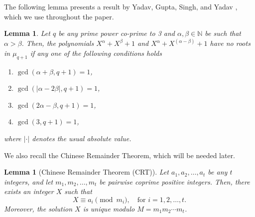 \documentclass[12pt,reqno]{amsart}
\newtheorem{lem}[thm]{Lemma}
\numberwithin{equation}{section}
\theoremstyle{definition}
\begin{document}
The following lemma presents a result by Yadav, Gupta, Singh, and Yadav \cite{Harsh}, which we use throughout the paper.
\begin{lem}\cite[Lemma 2.2]{Harsh}{\label{roots}}
Let $q$ be any prime power co-prime to 3 and $\alpha,\beta \in \mathbb{N}$ be such that $\alpha>\beta$. Then, the polynomials $X^\alpha+ X^\beta + 1$ and $X^\alpha+X^{(\alpha-\beta)}+1$ have no roots in $\mu_{q+1}$ if any one of the following conditions holds
\begin{enumerate}
\item $\gcd(\alpha+\beta,q+1)=1$,
\item $\gcd(|\alpha-2\beta|,q+1)=1$,
\item $\gcd(2\alpha-\beta,q+1)=1$,
\item  $\gcd(3,q+1)=1$,
\end{enumerate}
where $| \cdot |$ denotes the usual absolute value.
\end{lem}

We also recall the Chinese Remainder Theorem, which will be needed later.
\begin{lem}[Chinese Remainder Theorem (CRT)]\label{CRT}
    Let \( a_1, a_2, \dots, a_t \) be any \( t \) integers, and let \( m_1, m_2, \dots, m_t \) be pairwise coprime positive integers. Then, there exists an integer \( X \) such that  
    \[
    X \equiv a_i \pmod{m_i}, \quad \text{for } i = 1,2,\dots,t.
    \]
    Moreover, the solution \( X \) is unique modulo \( M = m_1 m_2 \cdots m_t \).
\end{lem}
\end{document}
